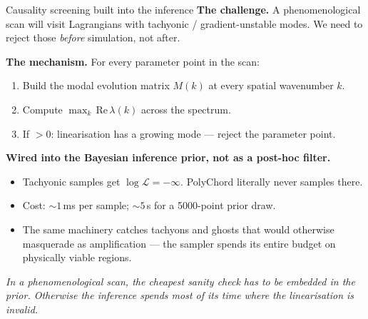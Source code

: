 \begin{frame}{Causality screening built into the inference}
  \textbf{The challenge.} A phenomenological scan will visit Lagrangians with tachyonic / gradient-unstable modes. We need to reject those \emph{before} simulation, not after.

  \vspace{0.2em}
  \textbf{The mechanism.} For every parameter point in the scan:
  \begin{enumerate}\small
    \item Build the modal evolution matrix $M(k)$ at every spatial wavenumber $k$.
    \item Compute $\max_{k}\,\mathrm{Re}\,\lambda(k)$ across the spectrum.
    \item If $> 0$: linearisation has a growing mode --- reject the parameter point.
  \end{enumerate}

  \vspace{0.2em}
  \textbf{Wired into the Bayesian inference prior, not as a post-hoc filter.}
  \begin{itemize}\small
    \item Tachyonic samples get $\log\mathcal{L} = -\infty$. PolyChord literally never samples there.
    \item Cost: $\sim\!1$\,ms per sample; $\sim\!5$\,s for a 5000-point prior draw.
    \item The same machinery catches tachyons and ghosts that would otherwise masquerade as amplification --- the sampler spends its entire budget on physically viable regions.
  \end{itemize}
  \vspace{0.2em}
  \emph{In a phenomenological scan, the cheapest sanity check has to be embedded in the prior. Otherwise the inference spends most of its time where the linearisation is invalid.}
\end{frame}
